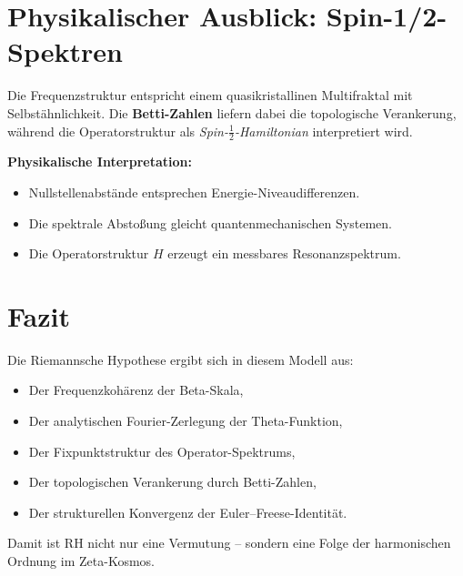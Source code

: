 \documentclass[12pt]{article}
\begin{document}
\section{Physikalischer Ausblick: Spin-1/2-Spektren}

Die Frequenzstruktur entspricht einem quasikristallinen Multifraktal mit Selbstähnlichkeit. Die \textbf{Betti-Zahlen} liefern dabei die topologische Verankerung, während die Operatorstruktur als \textit{Spin-$\tfrac{1}{2}$-Hamiltonian} interpretiert wird.

\textbf{Physikalische Interpretation:}
\begin{itemize}
\item Nullstellenabstände entsprechen Energie-Niveaudifferenzen.
\item Die spektrale Abstoßung gleicht quantenmechanischen Systemen.
\item Die Operatorstruktur $H$ erzeugt ein messbares Resonanzspektrum.
\end{itemize}

\section*{Fazit}

Die Riemannsche Hypothese ergibt sich in diesem Modell aus:

\begin{itemize}
\item Der Frequenzkohärenz der Beta-Skala,
\item Der analytischen Fourier-Zerlegung der Theta-Funktion,
\item Der Fixpunktstruktur des Operator-Spektrums,
\item Der topologischen Verankerung durch Betti-Zahlen,
\item Der strukturellen Konvergenz der Euler--Freese-Identität.
\end{itemize}

Damit ist RH nicht nur eine Vermutung – sondern eine Folge der harmonischen Ordnung im Zeta-Kosmos.
\end{document}

